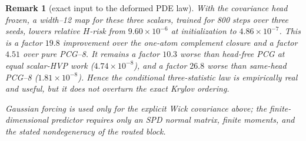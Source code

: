 \documentclass[11pt,a4paper]{article}
\newtheorem{remark}{Remark}
\theoremstyle{definition}
\begin{document}
\begin{remark}[exact input to the deformed PDE law]
With the covariance head frozen, a width--12 map for these three scalars,
trained for 800 steps over three seeds, lowers relative $H$-risk from
$9.60\times10^{-6}$ at initialization to $4.86\times10^{-7}$.  This is a
factor $19.8$ improvement over the one-atom complement closure and a factor
$4.51$ over pure PCG--8.  It remains a factor $10.3$ worse than head-free PCG
at equal scalar-HVP work ($4.74\times10^{-8}$), and a factor $26.8$ worse
than same-head PCG--8 ($1.81\times10^{-8}$).  Hence the conditional
three-statistic law is empirically real and useful, but it does not overturn
the exact Krylov ordering.

Gaussian forcing is used only for the explicit Wick covariance above; the
finite-dimensional predictor requires only an SPD normal matrix, finite
moments, and the stated nondegeneracy of the routed block.
\end{remark}
\end{document}
